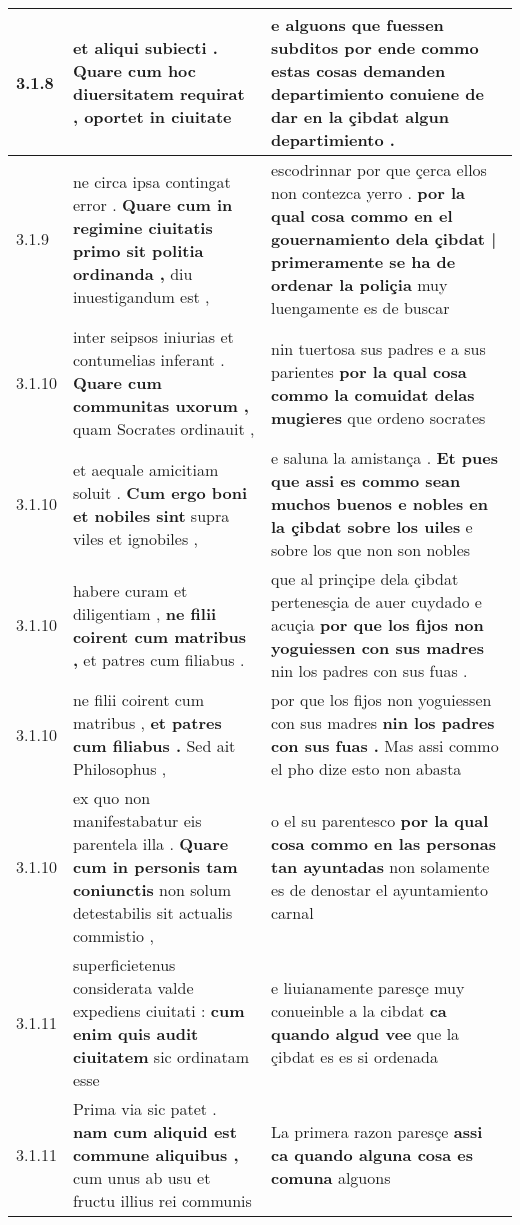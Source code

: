 \begin{tabular}{|p{1cm}|p{6.5cm}|p{6.5cm}|}
3.1.8 & et aliqui subiecti . \textbf{ Quare cum hoc diuersitatem requirat , } oportet in ciuitate & e alguons que fuessen subditos \textbf{ por ende commo estas cosas demanden departimiento } conuiene de dar en la çibdat algun departimiento . \\\hline
3.1.9 & ne circa ipsa contingat error . \textbf{ Quare cum in regimine ciuitatis primo sit politia ordinanda , } diu inuestigandum est , & escodrinnar por que çerca ellos non contezca yerro . \textbf{ por la qual cosa commo en el gouernamiento dela çibdat | primeramente se ha de ordenar la poliçia } muy luengamente es de buscar \\\hline
3.1.10 & inter seipsos iniurias et contumelias inferant . \textbf{ Quare cum communitas uxorum , } quam Socrates ordinauit , & nin tuertosa sus padres e a sus parientes \textbf{ por la qual cosa commo la comuidat delas mugieres } que ordeno socrates \\\hline
3.1.10 & et aequale amicitiam soluit . \textbf{ Cum ergo boni et nobiles sint } supra viles et ignobiles , & e saluna la amistança . \textbf{ Et pues que assi es commo sean muchos buenos e nobles en la çibdat sobre los uiles } e sobre los que non son nobles \\\hline
3.1.10 & habere curam et diligentiam , \textbf{ ne filii coirent cum matribus , } et patres cum filiabus . & que al prinçipe dela çibdat pertenesçia de auer cuydado e acuçia \textbf{ por que los fijos non yoguiessen con sus madres } nin los padres con sus fuas . \\\hline
3.1.10 & ne filii coirent cum matribus , \textbf{ et patres cum filiabus . } Sed ait Philosophus , & por que los fijos non yoguiessen con sus madres \textbf{ nin los padres con sus fuas . } Mas assi commo el pho dize esto non abasta \\\hline
3.1.10 & ex quo non manifestabatur eis parentela illa . \textbf{ Quare cum in personis tam coniunctis } non solum detestabilis sit actualis commistio , & o el su parentesco \textbf{ por la qual cosa commo en las personas tan ayuntadas } non solamente es de denostar el ayuntamiento carnal \\\hline
3.1.11 & superficietenus considerata valde expediens ciuitati : \textbf{ cum enim quis audit ciuitatem } sic ordinatam esse & e liuianamente paresçe muy conueinble a la cibdat \textbf{ ca quando algud vee } que la çibdat es es si ordenada \\\hline
3.1.11 & Prima via sic patet . \textbf{ nam cum aliquid est commune aliquibus , } cum unus ab usu et fructu illius rei communis & La primera razon paresçe \textbf{ assi ca quando alguna cosa es comuna } alguons \\\hline

\end{tabular}
